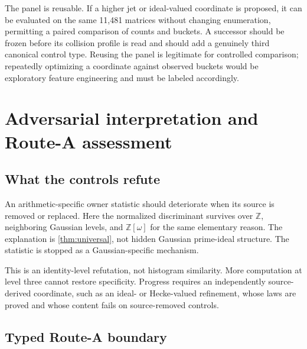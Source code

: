 \documentclass[11pt,a4paper]{article}
\theoremstyle{definition}
\theoremstyle{remark}
\newcommand{\Eis}{\mathbb{Z}[\omega]}
\begin{document}
The panel is reusable. If a higher jet or ideal-valued coordinate is proposed, it can be evaluated on the same 11,481 matrices without changing enumeration, permitting a paired comparison of counts and buckets. A successor should be frozen before its collision profile is read and should add a genuinely third canonical control type. Reusing the panel is legitimate for controlled comparison; repeatedly optimizing a coordinate against observed buckets would be exploratory feature engineering and must be labeled accordingly.

\section{Adversarial interpretation and Route-A assessment}

\subsection{What the controls refute}

An arithmetic-specific owner statistic should deteriorate when its source is removed or replaced. Here the normalized discriminant survives over \(\mathbb Z\), neighboring Gaussian levels, and \(\Eis\) for the same elementary reason. The explanation is \cref{thm:universal}, not hidden Gaussian prime-ideal structure. The statistic is stopped as a Gaussian-specific mechanism.

This is an identity-level refutation, not histogram similarity. More computation at level three cannot restore specificity. Progress requires an independently source-derived coordinate, such as an ideal- or Hecke-valued refinement, whose laws are proved and whose content fails on source-removed controls.

\subsection{Typed Route-A boundary}
\end{document}
